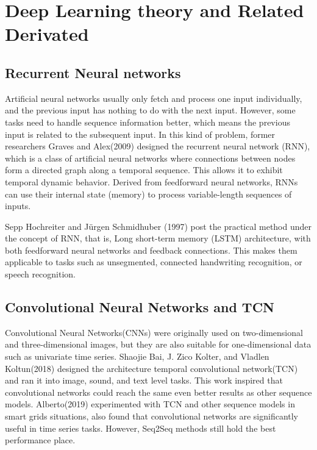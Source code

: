 
\chapter{Deep Learning theory and Related Derivated} %

\label{Chapter2} %

\setlength{\parindent}{0pt}

\section{Recurrent Neural networks}

Artificial neural networks usually only fetch and process one input individually, and the previous input has nothing to do with the next input. However, some tasks need to handle sequence information better, which means the previous input is related to the subsequent input. In this kind of problem, former researchers Graves and Alex(2009) designed the recurrent neural network (RNN), which is a class of artificial neural networks where connections between nodes form a directed graph along a temporal sequence. This allows it to exhibit temporal dynamic behavior. Derived from feedforward neural networks, RNNs can use their internal state (memory) to process variable-length sequences of inputs.

Sepp Hochreiter and Jürgen Schmidhuber (1997) post the practical method under the concept of RNN, that is, Long short-term memory (LSTM) architecture, with both feedforward neural networks and feedback connections.  This makes them applicable to tasks such as unsegmented, connected handwriting recognition, or speech recognition.

\section{Convolutional Neural Networks and TCN}

Convolutional Neural Networks(CNNs) were originally used on two-dimensional and three-dimensional images, but they are also suitable for one-dimensional data such as univariate time series. Shaojie Bai, J. Zico Kolter, and Vladlen Koltun(2018) designed the architecture temporal convolutional network(TCN) and ran it into image, sound, and text level tasks. This work inspired that convolutional networks could reach the same even better results as other sequence models. Alberto(2019) experimented with TCN and other sequence models in smart grids situations, also found that convolutional networks are significantly useful in time series tasks. However, Seq2Seq methods still hold the best performance place.

